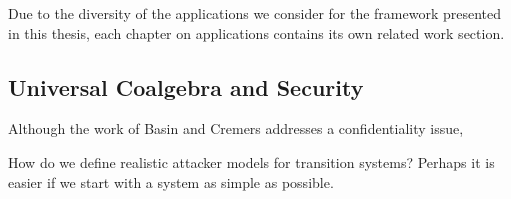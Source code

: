 Due to the diversity of the applications we consider for the framework presented in this thesis, each chapter on applications contains its own related work section.
\subsection{Universal Coalgebra and Security}





Although the work of Basin and Cremers addresses a confidentiality issue, 

How do we define realistic attacker models for transition systems? Perhaps it is easier if we start with a system as simple as possible. 
















